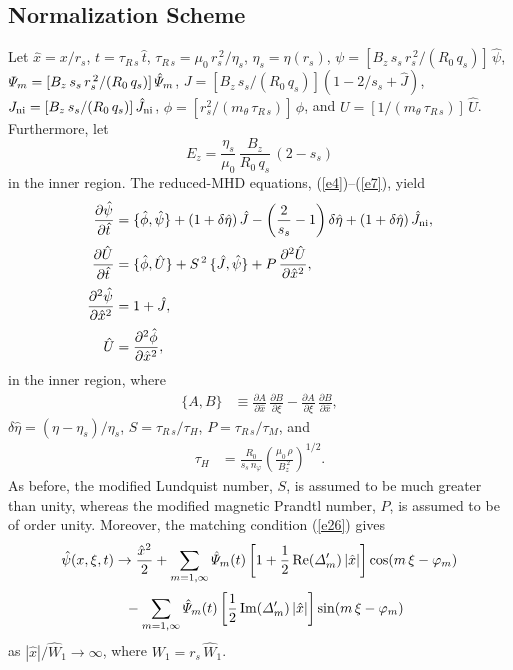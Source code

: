 \documentclass[12pt,prb,aps]{revtex4-1}
\begin{document}
\subsection{Normalization Scheme}
Let $\hat{x}=x/r_s$, $t=\tau_{R\,s}\,\hat{t}$, $\tau_{R\,s} = \mu_0\,r_s^{\,2}/\eta_s$, $\eta_s=\eta(r_s)$, $\psi = [B_z\,s_s\,r_s^{\,2}/(R_0\,q_s)]\,\hat{\psi}$, ${\mit\Psi}_m = [B_z\,s_s\,r_s^{\,2}/(R_0\,q_s)]\,\hat{\mit\Psi}_m$,
$J = [B_z\,s_s/(R_0\,q_s)]\left(1-2/s_s+\hat{J}\right)$, 
$J_{\rm ni} = [B_z\,s_s/(R_0\,q_s)]\,\hat{J}_{\rm ni}$, $\phi= [r_s^2/(m_\theta\,\tau_{R\,s})]\,\hat{\phi}$, and $U= [1/(m_\theta\,\tau_{R\,s})]\,\hat{U}$. 
Furthermore, let
\begin{equation}
E_z = \frac{\eta_s}{\mu_0}\,\frac{B_z}{R_0\,q_s}\,(
2-s_s)
\end{equation}
in the inner region.
The reduced-MHD equations, (\ref{e4})--(\ref{e7}), yield
\begin{align}\label{e38}
\frac{\partial\hat{\psi}}{\partial\hat{t}} &= \{\hat{\phi},\hat{\psi}\} + (1+\delta\hat{\eta})\,\hat{J} - \left(\frac{2}{s_s}-1\right)\delta\hat{\eta} + (1+\delta\hat{\eta})\,\hat{J}_{\rm ni},\\[0.5ex]
\frac{\partial\hat{U}}{\partial\hat{t}}&= \{\hat{\phi},\hat{U}\} + S^{\,2}\,\{\hat{J},\hat{\psi}\}+P\,\frac{\partial^2\hat{U}}{\partial{\hat{x}^2}},\label{e39}\\[0.5ex]
\frac{\partial^2\hat{\psi}}{\partial \hat{x}^2}&= 1+ \hat{J},\label{e40}\\[0.5ex]
\hat{U} &= \frac{\partial^2\hat{\phi}}{\partial \hat{x}^2},\label{e41}
\end{align}
in the inner region, where
\begin{align}
\{A,B\} &\equiv \frac{\partial A}{\partial\hat{x}}\,\frac{\partial B}{\partial\xi} - \frac{\partial A}{\partial\xi}\,\frac{\partial B}{\partial\hat{x}},
\end{align}
$\delta \hat{\eta} = (\eta-\eta_s)/\eta_s$, 
$S = \tau_{R\,s}/\tau_H$,
$P = \tau_{R\,s}/\tau_M$, and
\begin{align}
\tau_H &= \frac{R_0}{s_s\,n_\varphi}\left(\frac{\mu_0\,\rho}{B_z^{\,2}}\right)^{1/2}.
\end{align}
As before, the modified Lundquist number, $S$, is assumed to be much greater than unity, whereas the
modified magnetic Prandtl number, $P$, is assumed to
be of order unity. Moreover, the
matching condition (\ref{e26}) gives
\begin{align}
\hat{\psi}(x,\xi,t) &\rightarrow \frac{\hat{x}^2}{2} +\sum_{m=1,\infty}
\hat{\mit\Psi}_m(t)\left[1+\frac{1}{2}\,{\rm Re}({\mit\Delta}_m')\,|\hat{x}|\right]\cos(m\,\xi-\varphi_m)\nonumber\\[0.5ex]
&\phantom{=} -\sum_{m=1,\infty}\hat{\mit\Psi}_m(t)\left[\frac{1}{2}\,{\rm Im}({\mit\Delta}_m')\,|\hat{x}|\right]\sin(m\,\xi-\varphi_m)\label{e46x}
\end{align}
as $|\hat{x}|/\hat{W}_1\rightarrow\infty$, where
$W_1=r_s\,\hat{W}_1$. 
\end{document}
